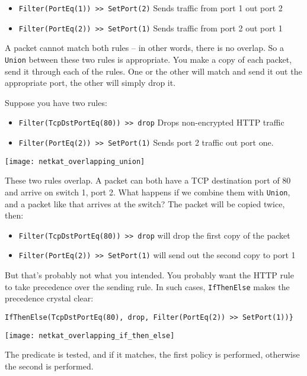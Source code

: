 \begin{itemize}
  \item \texttt{Filter(PortEq(1)) >> SetPort(2)} Sends traffic from port 1 out port 2 
  \item \texttt{Filter(PortEq(2)) >> SetPort(1)} Sends traffic from port 2 out port 1 
\end{itemize}

A packet cannot match both rules -- in other words, there is no overlap.  So a \texttt{Union} between
these two rules is appropriate.  You make a copy of each packet, send it through each of the rules.  
One or the other will match and send it out the appropriate port, the other will simply drop it.  

Suppose you have two rules:

\begin{itemize}
  \item \texttt{Filter(TcpDstPortEq(80)) >> drop} Drops non-encrypted HTTP traffic 
  \item \texttt{Filter(PortEq(2)) >> SetPort(1)} Sends port 2 traffic out port one.
\end{itemize}

\texttt{[image: netkat\_overlapping\_union]}

These two rules overlap.  A packet can both have a TCP destination port of 80 and
arrive on switch 1, port 2.  What happens if we combine them with \texttt{Union}, and a packet
like that arrives at the switch?  The packet will be copied twice, then:

\begin{itemize}
  \item \texttt{Filter(TcpDstPortEq(80)) >> drop} will drop the first copy of the packet 
  \item \texttt{Filter(PortEq(2)) >> SetPort(1)} will send out the second copy to port 1
\end{itemize}

But that's probably not what you intended.  You probably want the HTTP rule to take precedence over the
sending rule.  In such cases,
\texttt{IfThenElse} makes the precedence crystal clear:

\begin{verbatim}
IfThenElse(TcpDstPortEq(80), drop, Filter(PortEq(2)) >> SetPort(1))}
\end{verbatim}

\texttt{[image: netkat\_overlapping\_if\_then\_else]}

The predicate is tested, and if it matches, the first policy is performed, otherwise the second is performed.

